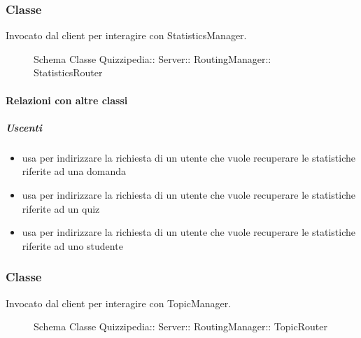 \subsubsection{Classe }
Invocato dal client per interagire con StatisticsManager.
\begin{figure}[H]
\centering
\noindent{}
\caption[Schema Classe StatisticsRouter]{Schema Classe Quizzipedia:: Server:: RoutingManager:: StatisticsRouter}
\end{figure}
\paragraph{Relazioni con altre classi}
\subparagraph{Uscenti}
\begin{itemize}
\item usa  per indirizzare la richiesta di un utente che vuole recuperare le statistiche riferite ad una domanda
\item usa  per indirizzare la richiesta di un utente che vuole recuperare le statistiche riferite ad un quiz
\item usa  per indirizzare la richiesta di un utente che vuole recuperare le statistiche riferite ad uno studente
\end{itemize}
\subsubsection{Classe }
Invocato dal client per interagire con TopicManager.
\begin{figure}[H]
\centering
\noindent{}
\caption[Schema Classe TopicRouter]{Schema Classe Quizzipedia:: Server:: RoutingManager:: TopicRouter}
\end{figure}
